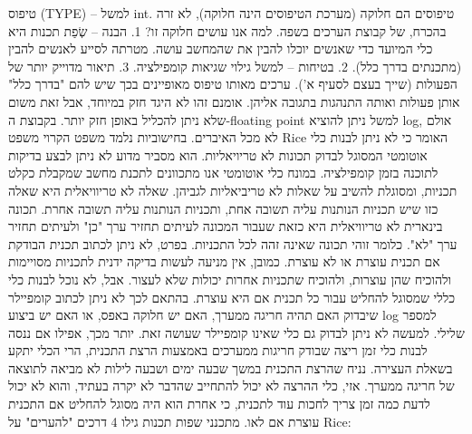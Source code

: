       טיפוס (TYPE) – למשל int. טיפוסים הם חלוקה (מערכת הטיפוסים הינה חלוקה), לא זרה
      בהכרח, של קבוצת הערכים בשפה. למה אנו עושים חלוקה זו?
      1. הבנה – שְׂפַת תכנות היא כלי המיועד כדי שאנשים יוכלו להבין את שהמחשב עושה.
      מטרתה לסייע לאנשים להבין (מתכנתים בדרך כלל).
      2. בטיחות – למשל גילוי שגיאות קומפילציה.
      3. תיאור מדוייק יותר של הפעולות (שייך בעצם לסעיף א').
      ערכים מאותו טיפוס מאופיינים בכך שיש להם "בדרך כלל" אותן פעולות ואותה התנהגות
      בתגובה אליהן. אומנם זהו לא היגד חזק במיוחד, אבל זאת משום שלא ניתן להכליל באופן
      חזק יותר. בקבוצת ה-floating point למשל ניתן להוציא log, אולם לא מכל האיברים.
      בחישוביות נלמד משפט הקרוי משפט Rice האומר כי לא ניתן לבנות כלי אוטומטי המסוגל
      לבדוק תכונות לא טריויאליות. הוא מסביר מדוע לא ניתן לבצע בדיקות לתוכנה בזמן
      קומפילציה.
      במונח כלי אוטומטי אנו מתכוונים לתכנת מחשב שמקבלת כקלט תכניות, ומסוגלת להשיב על
      שאלות לא טריביאליות לגביהן. שאלה לא טריוויאלית היא שאלה כזו שיש תכניות הנותנות
      עליה תשובה אחת, ותכניות הנותנות עליה תשובה אחרת. תכונה בינארית לא טריוויאלית
      היא כזאת שעבור המכונה לעיתים תחזיר ערך "כן" ולעיתים תחזיר ערך "לא". כלומר זוהי
      תכונה שאינה זהה לכל התכניות. בפרט, לא ניתן לכתוב תכנית הבודקת אם תכנית עוצרת
      או לא עוצרת. כמובן, אין מניעה לעשות בדיקה ידנית לתכניות מסויימות ולהוכיח שהן
      עוצרות, ולהוכיח שתכניות אחרות יכולות שלא לעצור. אבל, לא נוכל לבנות כלי כללי
      שמסוגל להחליט עבור כל תכנית אם היא עוצרת. בהתאם לכך לא ניתן לכתוב קומפיילר
      שיבדוק האם תהיה חריגה ממערך, האם יש חלוקה באפס, או האם יש ביצוע log למספר
      שלילי. למעשה לא ניתן לבדוק גם כלי שאינו קומפיילר שעושה זאת. יותר מכך, אפילו אם
      ננסה לבנות כלי זמן ריצה שבודק חריגות ממערכים באמצעות הרצת התכנית, הרי הכלי יתקע
      בשאלת העצירה. נניח שהרצת התכנית במשך שבעה ימים ושבעה לילות לא מביאה לתוצאה של
      חריגה ממערך. אזי, כלי ההרצה לא יכול להתחייב שהדבר לא יקרה בעתיד, והוא לא יכול
      לדעת כמה זמן צריך לחכות עוד לתכנית, כי אחרת הוא היה מסוגל להחליט אם התכנית
      עוצרת אם לאו.
      מתכנני שפות תכנות גילו 4 דרכים "להערים" על Rice:
